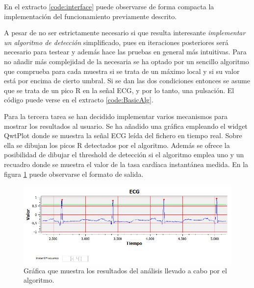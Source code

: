         En el extracto \ref{code:interface} puede observarse de forma compacta la implementación del funcionamiento previamente descrito. 
        
        
        A pesar de no ser estrictamente necesario si que resulta interesante \textit{implementar un algoritmo de detección} simplificado, pues en iteraciones posteriores será necesario para testear y además hace las pruebas en general más intuitivas. Para no añadir más complejidad de la necesaria se ha optado por un sencillo algoritmo que comprueba para cada muestra si se trata de un máximo local y si su valor está por encima de cierto umbral. Si se dan las dos condiciones entonces se asume que se trata de un pico R en la señal ECG, y por lo tanto, una pulsación. El código puede verse en el extracto \ref{code:BasicAlg}.
        
        

        Para la tercera tarea se han decidido implementar varios mecanismos para mostrar los resultados al usuario. Se ha añadido una gráfica empleando el widget QwtPlot donde se muestra la señal ECG leída del fichero en tiempo real. Sobre ella se dibujan los picos R detectados por el algoritmo. Además se ofrece la posibilidad de dibujar el threshold de detección si el algoritmo emplea uno y un recuadro donde se muestra el valor de la tasa cardíaca instantánea medida. En la figura \ref{fig:resultsBasic} puede observarse el formato de salida.

        \begin{figure}[H]
                \centering
                        \includegraphics[width =\linewidth]{figuras/ResultsBasic.png}
                \caption{Gráfica que muestra los resultados del análisis llevado a cabo por el algoritmo.}
                \label{fig:resultsBasic}
        \end{figure}
        
